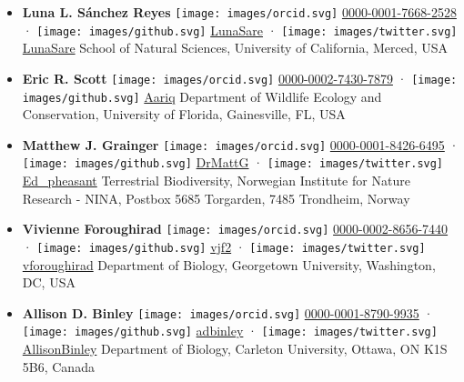 \begin{itemize}
\item
  \textbf{Luna L. Sánchez Reyes}
  \texttt{[image: images/orcid.svg]}
  \href{https://orcid.org/0000-0001-7668-2528}{0000-0001-7668-2528}
  · \texttt{[image: images/github.svg]}
  \href{https://github.com/LunaSare}{LunaSare}
  · \texttt{[image: images/twitter.svg]}
  \href{https://twitter.com/LunaSare}{LunaSare}
  School of Natural Sciences, University of California, Merced, USA
\item
  \textbf{Eric R. Scott}
  \texttt{[image: images/orcid.svg]}
  \href{https://orcid.org/0000-0002-7430-7879}{0000-0002-7430-7879}
  · \texttt{[image: images/github.svg]}
  \href{https://github.com/Aariq}{Aariq}
  Department of Wildlife Ecology and Conservation, University of Florida, Gainesville, FL, USA
\item
  \textbf{Matthew J. Grainger}
  \texttt{[image: images/orcid.svg]}
  \href{https://orcid.org/0000-0001-8426-6495}{0000-0001-8426-6495}
  · \texttt{[image: images/github.svg]}
  \href{https://github.com/DrMattG}{DrMattG}
  · \texttt{[image: images/twitter.svg]}
  \href{https://twitter.com/Ed_pheasant}{Ed\_pheasant}
  Terrestrial Biodiversity, Norwegian Institute for Nature Research - NINA, Postbox 5685 Torgarden, 7485 Trondheim, Norway
\item
  \textbf{Vivienne Foroughirad}
  \texttt{[image: images/orcid.svg]}
  \href{https://orcid.org/0000-0002-8656-7440}{0000-0002-8656-7440}
  · \texttt{[image: images/github.svg]}
  \href{https://github.com/vjf2}{vjf2}
  · \texttt{[image: images/twitter.svg]}
  \href{https://twitter.com/vforoughirad}{vforoughirad}
  Department of Biology, Georgetown University, Washington, DC, USA
\item
  \textbf{Allison D. Binley}
  \texttt{[image: images/orcid.svg]}
  \href{https://orcid.org/0000-0001-8790-9935}{0000-0001-8790-9935}
  · \texttt{[image: images/github.svg]}
  \href{https://github.com/adbinley}{adbinley}
  · \texttt{[image: images/twitter.svg]}
  \href{https://twitter.com/AllisonBinley}{AllisonBinley}
  Department of Biology, Carleton University, Ottawa, ON K1S 5B6, Canada

\end{itemize}
